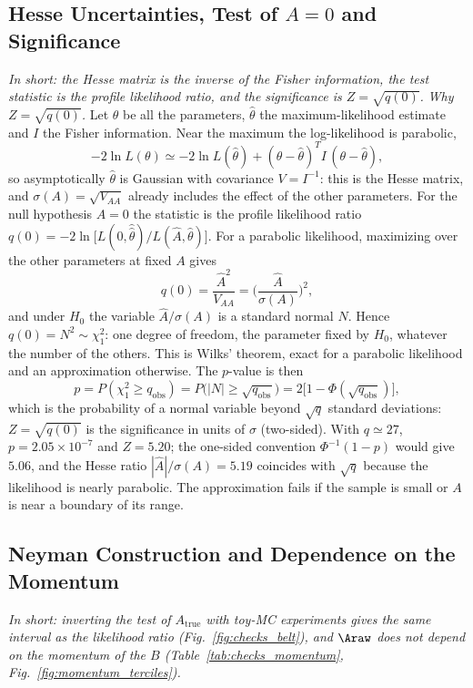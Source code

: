 \subsection{Hesse Uncertainties, Test of $A=0$ and Significance}
\label{sec:appendix_freq}
\emph{In short: the Hesse matrix is the inverse of the Fisher information, the test statistic is the profile likelihood ratio, and the significance is $Z=\sqrt{q(0)}$.}
\emph{Why $Z=\sqrt{q(0)}$.} Let $\theta$ be all the parameters, $\hat\theta$ the maximum-likelihood estimate and $I$ the Fisher information. Near the maximum the log-likelihood is parabolic,
\[
-2\ln L(\theta)\simeq-2\ln L(\hat\theta)+(\theta-\hat\theta)^{T}I\,(\theta-\hat\theta),
\]
so asymptotically $\hat\theta$ is Gaussian with covariance $V=I^{-1}$: this is the Hesse matrix, and $\sigma(A)=\sqrt{V_{AA}}$ already includes the effect of the other parameters. For the null hypothesis $A=0$ the statistic is the profile likelihood ratio $q(0)=-2\ln\big[L(0,\hat{\hat\theta})/L(\hat A,\hat\theta)\big]$. For a parabolic likelihood, maximizing over the other parameters at fixed $A$ gives
\[
q(0)=\frac{\hat A^{2}}{V_{AA}}=\Big(\frac{\hat A}{\sigma(A)}\Big)^{2},
\]
and under $H_0$ the variable $\hat A/\sigma(A)$ is a standard normal $N$. Hence $q(0)=N^{2}\sim\chi^{2}_{1}$: one degree of freedom, the parameter fixed by $H_0$, whatever the number of the others. This is Wilks' theorem, exact for a parabolic likelihood and an approximation otherwise. The $p$-value is then
\[
p=P(\chi^{2}_{1}\geq q_{\mathrm{obs}})=P\big(|N|\geq\sqrt{q_{\mathrm{obs}}}\big)=2\big[1-\Phi(\sqrt{q_{\mathrm{obs}}})\big],
\]
which is the probability of a normal variable beyond $\sqrt{q}$ standard deviations: $Z=\sqrt{q(0)}$ is the significance in units of $\sigma$ (two-sided). With $q\simeq27$, $p=2.05\times10^{-7}$ and $Z=5.20$; the one-sided convention $\Phi^{-1}(1-p)$ would give $5.06$, and the Hesse ratio $|\hat A|/\sigma(A)=5.19$ coincides with $\sqrt q$ because the likelihood is nearly parabolic. The approximation fails if the sample is small or $A$ is near a boundary of its range.

\subsection{Neyman Construction and Dependence on the Momentum}
\label{sec:checks_belt}
\emph{In short: inverting the test of $A_{\mathrm{true}}$ with toy-MC experiments gives the same interval as the likelihood ratio (Fig.~\ref{fig:checks_belt}), and $\Araw$ does not depend on the momentum of the $B$ (Table~\ref{tab:checks_momentum}, Fig.~\ref{fig:momentum_terciles}).}


